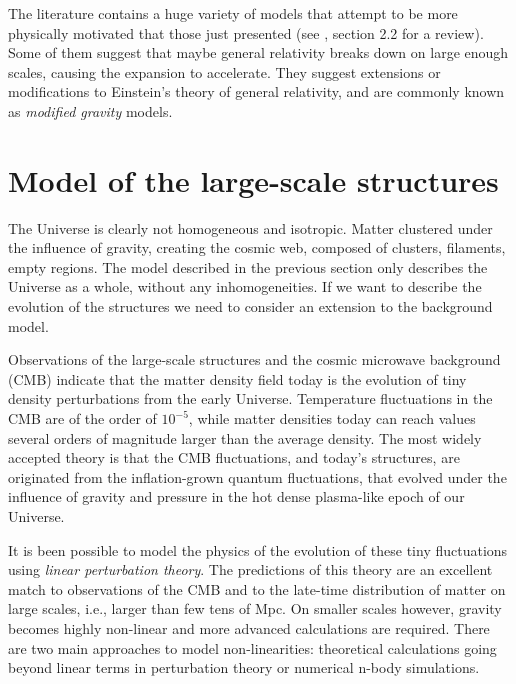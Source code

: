     The literature contains a huge variety of models that attempt to be more physically motivated
    that those just presented (see \cite{weinbergObservationalProbesCosmic2013}, section 2.2 for a review). 
    Some of them suggest that maybe general relativity breaks down on large enough scales, 
    causing the expansion to accelerate. They suggest extensions or modifications to Einstein's 
    theory of general relativity, and are commonly known as \emph{modified gravity} models.   




\section{Model of the large-scale structures}
\label{intro:lss}

    The Universe is clearly not homogeneous and isotropic. 
    Matter clustered under the influence of gravity, creating the cosmic web,
    composed of clusters, filaments, empty regions. 
    The model described in the previous section only describes the Universe
    as a whole, without any inhomogeneities. If we want to describe 
    the evolution of the structures we need to consider an extension to
    the background model. 

    Observations of the large-scale structures and  
    the cosmic microwave background (CMB)
    indicate that the matter density field today is the evolution of 
    tiny density perturbations from the early Universe. 
    Temperature fluctuations in the CMB are of the order of $10^{-5}$, 
    while matter densities today can reach values several orders of magnitude 
    larger than the average density.
    The most widely accepted theory is that the CMB fluctuations,
    and today's structures, are originated
    from the inflation-grown quantum fluctuations, that evolved under the 
    influence of gravity and pressure in the hot dense plasma-like epoch of our Universe. 
    
    It is been possible to model the physics of the evolution of these tiny 
    fluctuations using \emph{linear perturbation theory}. The predictions of this 
    theory are an excellent match to observations of the CMB and to the late-time
    distribution of matter on large scales, i.e., larger than few tens of Mpc. 
    On smaller scales however, gravity becomes highly non-linear and more advanced 
    calculations are required. There are two main approaches to model non-linearities:
    theoretical calculations going beyond linear terms in perturbation theory 
    or numerical n-body simulations. 

